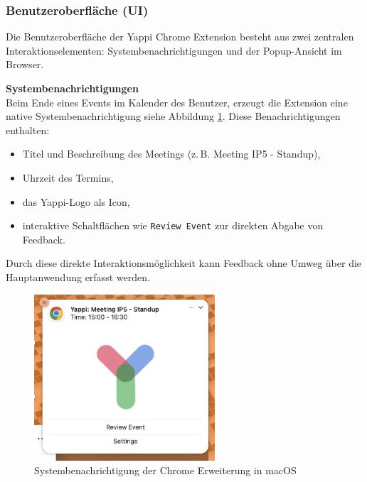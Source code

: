\documentclass[12pt,a4paper]{report}
\begin{document}
    \subsubsection{Benutzeroberfläche (UI)}
        Die Benutzeroberfläche der Yappi Chrome Extension besteht aus zwei zentralen Interaktionselementen: Systembenachrichtigungen und der Popup-Ansicht im Browser.

        \textbf{Systembenachrichtigungen} \\
            Beim Ende eines Events im Kalender des Benutzer, erzeugt die Extension eine native Systembenachrichtigung siehe Abbildung \ref{fig:yappi-extension-notification}.
            Diese Benachrichtigungen enthalten:
            \begin{itemize}
                \item Titel und Beschreibung des Meetings (z.\,B. \glqq Meeting IP5 - Standup\grqq),
                \item Uhrzeit des Termins,
                \item das Yappi-Logo als Icon,
                \item interaktive Schaltflächen wie \texttt{Review Event} zur direkten Abgabe von Feedback.
            \end{itemize}
            Durch diese direkte Interaktionsmöglichkeit kann Feedback ohne Umweg über die Hauptanwendung erfasst werden.

            \begin{figure}[H]
              \centering
              \includegraphics[width=0.60\textwidth]{../figures/yappi-chrome-extension/yappi-extension-notification.jpg}
              \caption{Systembenachrichtigung der Chrome Erweiterung in macOS}
              \label{fig:yappi-extension-notification}
            \end{figure}
\end{document}

